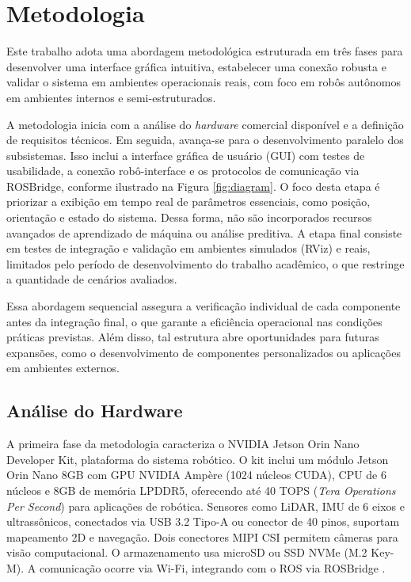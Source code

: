 \section{Metodologia}
\label{sec:metodologia}


Este trabalho adota uma abordagem metodológica estruturada em três fases para desenvolver uma interface gráfica intuitiva, estabelecer uma conexão robusta e validar o sistema em ambientes operacionais reais, com foco em robôs autônomos em ambientes internos e semi-estruturados. 


A metodologia inicia com a análise do \textit{hardware} comercial disponível e a definição de requisitos técnicos. Em seguida, avança-se para o desenvolvimento paralelo dos subsistemas. Isso inclui a interface gráfica de usuário (GUI) com testes de usabilidade, a conexão robô-interface e os protocolos de comunicação via ROSBridge, conforme ilustrado na Figura \ref{fig:diagram}. O foco desta etapa é priorizar a exibição em tempo real de parâmetros essenciais, como posição, orientação e estado do sistema. Dessa forma, não são incorporados recursos avançados de aprendizado de máquina ou análise preditiva. A etapa final consiste em testes de integração e validação em ambientes simulados (RViz) e reais, limitados pelo período de desenvolvimento do trabalho acadêmico, o que restringe a quantidade de cenários avaliados.

Essa abordagem sequencial assegura a verificação individual de cada componente antes da integração final, o que garante a eficiência operacional nas condições práticas previstas. Além disso, tal estrutura abre oportunidades para futuras expansões, como o desenvolvimento de componentes personalizados ou aplicações em ambientes externos.

\subsection{Análise do Hardware}

A primeira fase da metodologia caracteriza o NVIDIA Jetson Orin Nano Developer Kit, plataforma do sistema robótico. O kit inclui um módulo Jetson Orin Nano 8GB com GPU NVIDIA Ampère (1024 núcleos CUDA), CPU de 6 núcleos e 8GB de memória LPDDR5, oferecendo até 40 TOPS (\textit{Tera Operations Per Second}) para aplicações de robótica. Sensores como LiDAR, IMU de 6 eixos e ultrassônicos, conectados via USB 3.2 Tipo-A ou conector de 40 pinos, suportam mapeamento 2D e navegação. Dois conectores MIPI CSI permitem câmeras para visão computacional. O armazenamento usa microSD ou SSD NVMe (M.2 Key-M). A comunicação ocorre via Wi-Fi, integrando com o ROS via ROSBridge \cite{NVIDIA_JetsonOrinNano}.


